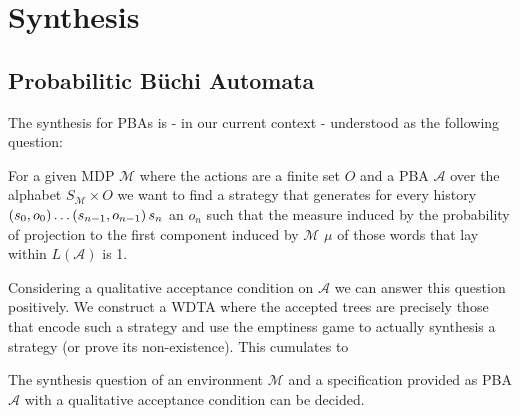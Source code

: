 \chapter{Synthesis}
\section{Probabilitic Büchi Automata}
The synthesis for \acp{PBA} is - in our current context - understood as the
following question:
\begin{definition}
  For a given \ac{MDP} $\mathcal{M}$ where the actions are a finite set $O$ and
  a \ac{PBA} $\mathcal{A}$ over the alphabet $S_{\mathcal{M}}\times O$ we want
  to find a strategy that generates for every history
  $\left(s_{0}, o_{0}\right)\dots\left(s_{n-1},o_{n-1}\right)s_{n}$ an
  $o_{n}$ such that the measure induced by the probability of projection to the
  first component induced by $\mathcal{M}$ $\mu$ of those words that lay within
  $L(\mathcal{A})$ is 1.
\end{definition}
Considering a qualitative acceptance condition on $\mathcal{A}$ we can answer
this question positively. We construct a \ac{WDTA} where the accepted trees are
precisely those that encode such a strategy and use the emptiness game to
actually synthesis a strategy (or prove its non-existence). This cumulates to
\begin{theorem}
  The synthesis question of an environment $\mathcal{M}$ and a specification
  provided as \ac{PBA} $\mathcal{A}$ with a qualitative acceptance condition
  can be decided.
\end{theorem}
